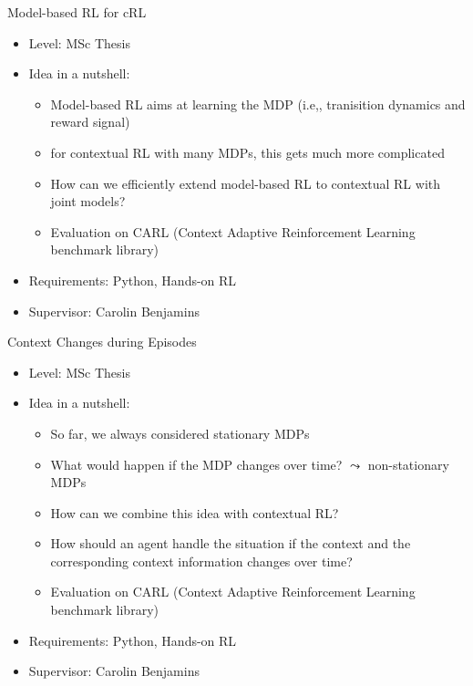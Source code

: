 \documentclass[aspectratio=169]{../latex_main/tntbeamer}  %
\begin{document}
\begin{frame}[c]{Model-based RL for cRL}
	
    \begin{itemize}
		\item Level: MSc Thesis
		\item Idea in a nutshell:
		\begin{itemize}
		    \item Model-based RL aims at learning the MDP (i.e,, tranisition dynamics and reward signal)
		    \item for contextual RL with many MDPs, this gets much more complicated
		    \item How can we efficiently extend model-based RL to contextual RL  with joint models?
		    \item Evaluation on CARL (Context Adaptive Reinforcement Learning benchmark library)
		\end{itemize}
		\item Requirements: Python, Hands-on RL
		\item Supervisor: Carolin Benjamins
	\end{itemize}
	
\end{frame}
\begin{frame}[c]{Context Changes during Episodes}
	
    \begin{itemize}
		\item Level: MSc Thesis
		\item Idea in a nutshell:
		\begin{itemize}
		    \item So far, we always considered stationary MDPs 
		    \item What would happen if the MDP changes over time? $\leadsto$ non-stationary MDPs 
		    \item How can we combine this idea with contextual RL? 
		    \item How should an agent handle the situation if the context and the corresponding context information changes over time?
		    \item Evaluation on CARL (Context Adaptive Reinforcement Learning benchmark library)
		\end{itemize}
		\item Requirements: Python, Hands-on RL
		\item Supervisor: Carolin Benjamins
	\end{itemize}
	
\end{frame}
\end{document}
